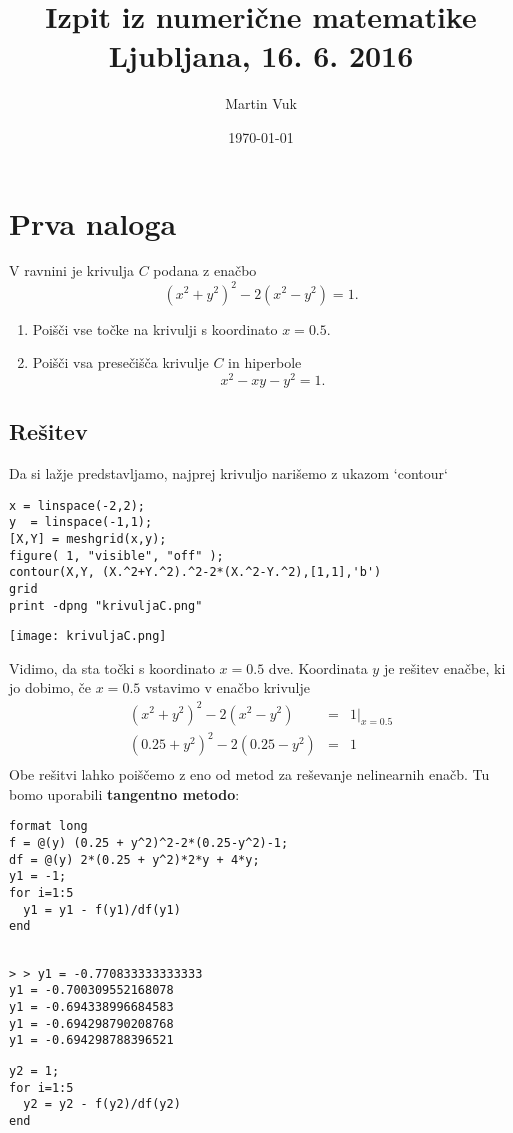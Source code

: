 \documentclass[11pt]{article}
\author{Martin Vuk}
\date{\today}
\title{Izpit iz numerične matematike\\\medskip
\large Ljubljana, 16. 6. 2016}
\begin{document}
\maketitle
\tableofcontents


\section{Prva naloga}
\label{sec:orgheadline3}
V ravnini je krivulja $C$ podana z enačbo
$$(x^2+y^2)^2-2(x^2-y^2)=1.$$
\begin{enumerate}
\item Poišči vse točke na krivulji s koordinato $x=0.5$.
\item Poišči vsa presečišča krivulje $C$ in hiperbole
$$x^2-xy-y^2=1.$$ 
\end{enumerate}

\subsection{Rešitev}
\label{sec:orgheadline2}
Da si lažje predstavljamo, najprej krivuljo narišemo z ukazom `contour`
\begin{verbatim}
x = linspace(-2,2);
y  = linspace(-1,1);
[X,Y] = meshgrid(x,y);
figure( 1, "visible", "off" );
contour(X,Y, (X.^2+Y.^2).^2-2*(X.^2-Y.^2),[1,1],'b')
grid
print -dpng "krivuljaC.png"
\end{verbatim}

\texttt{[image: krivuljaC.png]} 

Vidimo, da sta točki s koordinato \(x=0.5\) dve. Koordinata \(y\) je rešitev enačbe,
ki jo dobimo, če \(x=0.5\) vstavimo v enačbo krivulje 
\begin{eqnarray*}
(x^2+y^2)^2-2(x^2-y^2)&=&1|_{x=0.5}\\
(0.25+y^2)^2-2(0.25-y^2)&=&1\\
\end{eqnarray*}
Obe rešitvi lahko poiščemo z eno od metod
za reševanje nelinearnih enačb. Tu bomo uporabili \textbf{tangentno metodo}:
\begin{verbatim}
format long
f = @(y) (0.25 + y^2)^2-2*(0.25-y^2)-1;
df = @(y) 2*(0.25 + y^2)*2*y + 4*y;
y1 = -1;
for i=1:5
  y1 = y1 - f(y1)/df(y1)
end
\end{verbatim}

\begin{verbatim}

> > y1 = -0.770833333333333
y1 = -0.700309552168078
y1 = -0.694338996684583
y1 = -0.694298790208768
y1 = -0.694298788396521
\end{verbatim}
\begin{verbatim}
y2 = 1;
for i=1:5
  y2 = y2 - f(y2)/df(y2)
end
\end{verbatim}
\end{document}
